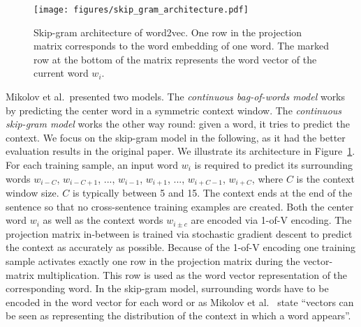 \documentclass[
        a4paper,
        titlepage,
        twoside,
        parskip,
        numbers=noenddot
        ]{scrbook}
\theoremstyle{break}
\begin{document}

\begin{figure}
       \centering
       \texttt{[image: figures/skip\_gram\_architecture.pdf]}
       \caption{Skip-gram architecture of word2vec.
       One row in the projection matrix corresponds to the word embedding of one word.
       The marked row at the bottom of the matrix represents the word vector of the current word $w_i$.}
       \label{fig:skip_gram_architecture}
\end{figure}

Mikolov et al.\ presented two models.
The \emph{continuous bag-of-words model} works by predicting the center word in a symmetric context window.
The \emph{continuous skip-gram model} works the other way round: given a word, it tries to predict the context.
We focus on the skip-gram model in the following, as it had the better evaluation results in the original paper.
We illustrate its architecture in Figure~\ref{fig:skip_gram_architecture}.
For each training sample, an input word $w_i$ is required to predict its surrounding words $w_{i - C}$, $w_{i - C + 1}$, ..., $w_{i - 1}$, $w_{i + 1}$, ..., $w_{i + C - 1}$, $w_{i + C}$, where $C$ is the context window size.
$C$ is typically between 5 and 15.
The context ends at the end of the sentence so that no cross-sentence training examples are created.
Both the center word $w_i$ as well as the context words $w_{i \pm c}$ are encoded via 1-of-V encoding.
The projection matrix in-between is trained via stochastic gradient descent to predict the context as accurately as possible.
Because of the 1-of-V encoding one training sample activates exactly one row in the projection matrix during the vector-matrix multiplication.
This row is used as the word vector representation of the corresponding word.
In the skip-gram model, surrounding words have to be encoded in the word vector for each word or as Mikolov et al.~\cite{Mikolov2013} state ``vectors can be seen as representing the distribution of the context in which a word appears''.
\end{document}

